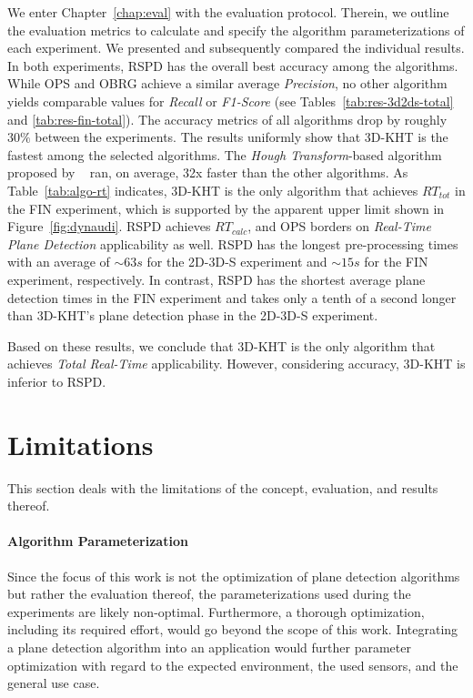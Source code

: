 \documentclass[main.tex]{subfiles}
\begin{document}
We enter Chapter~\ref{chap:eval} with the evaluation protocol. Therein, we outline the evaluation metrics to calculate and specify the algorithm parameterizations of each experiment. We presented and subsequently compared the individual results.
In both experiments, RSPD has the overall best accuracy among the algorithms. While OPS and OBRG achieve a similar average \textit{Precision}, no other algorithm yields comparable values for \textit{Recall} or \textit{F1-Score} (see Tables~\ref{tab:res-3d2ds-total} and \ref{tab:res-fin-total}). The accuracy metrics of all algorithms drop by roughly $30\%$ between the experiments.
The results uniformly show that 3D-KHT is the fastest among the selected algorithms. The \textit{Hough Transform}-based algorithm proposed by \citeauthor{LimbergerOliveira2015HT3D}~\cite{LimbergerOliveira2015HT3D} ran, on average, 32x faster than the other algorithms. As Table~\ref{tab:algo-rt} indicates, 3D-KHT is the only algorithm that achieves $RT_{tot}$ in the FIN experiment, which is supported by the apparent upper limit shown in Figure~\ref{fig:dynaudi}. RSPD achieves $RT_{calc}$, and OPS borders on \textit{Real-Time Plane Detection} applicability as well. RSPD has the longest pre-processing times with an average of ${\sim}63s$ for the 2D-3D-S experiment and ${\sim}15s$ for the FIN experiment, respectively. In contrast, RSPD has the shortest average plane detection times in the FIN experiment and takes only a tenth of a second longer than 3D-KHT's plane detection phase in the 2D-3D-S experiment.

Based on these results, we conclude that 3D-KHT is the only algorithm that achieves \textit{Total Real-Time} applicability. However, considering accuracy, 3D-KHT is inferior to RSPD.


\section{Limitations}
This section deals with the limitations of the concept, evaluation, and results thereof.
\paragraph{Algorithm Parameterization}
Since the focus of this work is not the optimization of plane detection algorithms but rather the evaluation thereof, the parameterizations used during the experiments are likely non-optimal. Furthermore, a thorough optimization, including its required effort, would go beyond the scope of this work. 
Integrating a plane detection algorithm into an application would further parameter optimization with regard to the expected environment, the used sensors, and the general use case.
\end{document}
